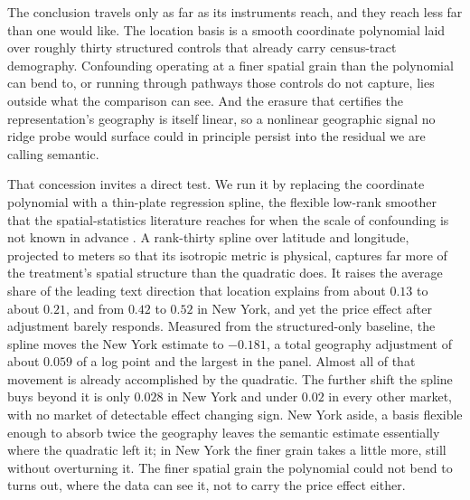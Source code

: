 The conclusion travels only as far as its
instruments reach, and they reach less far than one would like. The location
basis is a smooth coordinate polynomial laid over roughly thirty structured
controls that already carry census-tract demography. Confounding operating at a
finer spatial grain than the polynomial can bend to, or running through pathways
those controls do not capture, lies outside what the comparison can see. And the
erasure that certifies the representation's geography is itself linear, so a
nonlinear geographic signal no ridge probe would surface could in principle
persist into the residual we are calling semantic.

That concession invites a direct test. We run it by replacing the coordinate
polynomial with a thin-plate regression spline, the flexible low-rank smoother
that the spatial-statistics literature reaches for when the scale of confounding
is not known in advance \citep{keller2020selecting,gilbert2021causal}. A
rank-thirty spline over latitude and longitude, projected to meters so that its
isotropic metric is physical, captures far more of the treatment's spatial
structure than the quadratic does. It raises the average share of the leading text
direction that location explains from about $0.13$ to about $0.21$, and from $0.42$
to $0.52$ in New York, and yet the price effect after adjustment barely responds.
Measured from the structured-only baseline, the spline moves the New York estimate
to $-0.181$, a total geography adjustment of about $0.059$ of a log point and the
largest in the panel. Almost all of that movement is already accomplished by
the quadratic. The further shift the spline buys beyond it is only $0.028$ in
New York and under $0.02$ in every other market, with no market of detectable
effect changing sign. New York aside, a basis flexible enough to absorb twice the
geography leaves the semantic estimate essentially where the quadratic left it; in
New York the finer grain takes a little more, still without overturning it. The finer spatial grain the
polynomial could not bend to turns out, where the data can see it, not to carry
the price effect either.

